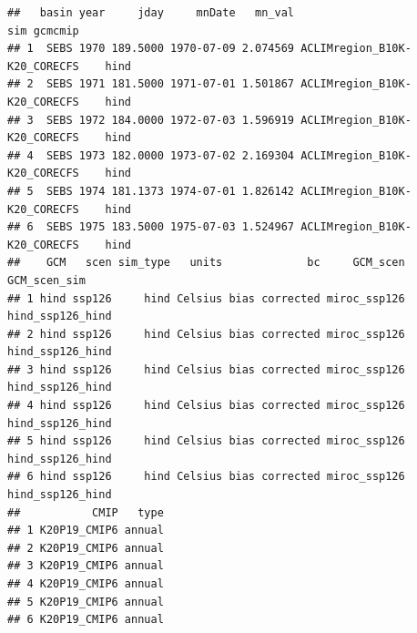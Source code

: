 \documentclass[
]{article}
\newenvironment{Shaded}{\begin{snugshade}}{\end{snugshade}}
\newcommand{\AttributeTok}[1]{\textcolor[rgb]{0.77,0.63,0.00}{#1}}
\newcommand{\CommentTok}[1]{\textcolor[rgb]{0.56,0.35,0.01}{\textit{#1}}}
\newcommand{\DecValTok}[1]{\textcolor[rgb]{0.00,0.00,0.81}{#1}}
\newcommand{\FunctionTok}[1]{\textcolor[rgb]{0.00,0.00,0.00}{#1}}
\newcommand{\NormalTok}[1]{#1}
\newcommand{\OtherTok}[1]{\textcolor[rgb]{0.56,0.35,0.01}{#1}}
\newcommand{\SpecialCharTok}[1]{\textcolor[rgb]{0.00,0.00,0.00}{#1}}
\newcommand{\StringTok}[1]{\textcolor[rgb]{0.31,0.60,0.02}{#1}}
\begin{document}
\begin{Shaded}
\end{Shaded}

\begin{Shaded}
\end{Shaded}

\begin{verbatim}
##   basin year     jday     mnDate   mn_val                          sim gcmcmip
## 1  SEBS 1970 189.5000 1970-07-09 2.074569 ACLIMregion_B10K-K20_CORECFS    hind
## 2  SEBS 1971 181.5000 1971-07-01 1.501867 ACLIMregion_B10K-K20_CORECFS    hind
## 3  SEBS 1972 184.0000 1972-07-03 1.596919 ACLIMregion_B10K-K20_CORECFS    hind
## 4  SEBS 1973 182.0000 1973-07-02 2.169304 ACLIMregion_B10K-K20_CORECFS    hind
## 5  SEBS 1974 181.1373 1974-07-01 1.826142 ACLIMregion_B10K-K20_CORECFS    hind
## 6  SEBS 1975 183.5000 1975-07-03 1.524967 ACLIMregion_B10K-K20_CORECFS    hind
##    GCM   scen sim_type   units             bc     GCM_scen     GCM_scen_sim
## 1 hind ssp126     hind Celsius bias corrected miroc_ssp126 hind_ssp126_hind
## 2 hind ssp126     hind Celsius bias corrected miroc_ssp126 hind_ssp126_hind
## 3 hind ssp126     hind Celsius bias corrected miroc_ssp126 hind_ssp126_hind
## 4 hind ssp126     hind Celsius bias corrected miroc_ssp126 hind_ssp126_hind
## 5 hind ssp126     hind Celsius bias corrected miroc_ssp126 hind_ssp126_hind
## 6 hind ssp126     hind Celsius bias corrected miroc_ssp126 hind_ssp126_hind
##           CMIP   type
## 1 K20P19_CMIP6 annual
## 2 K20P19_CMIP6 annual
## 3 K20P19_CMIP6 annual
## 4 K20P19_CMIP6 annual
## 5 K20P19_CMIP6 annual
## 6 K20P19_CMIP6 annual
\end{verbatim}
\end{document}
